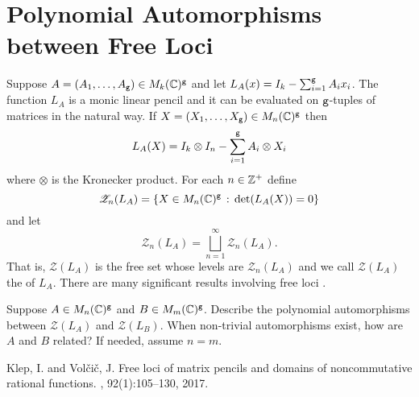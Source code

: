 \section{Polynomial Automorphisms between Free Loci}

Suppose $A = (A_1,\dots, A_{\texttt{g}})\in M_k(\mathbb{C})^{\texttt{g}}$ and let $L_A(x) = I_k - \sum_{i=1}^{\texttt{g}} A_ix_i$.
The function $L_A$ is a monic linear pencil and it can be evaluated on ${\texttt{g}}$-tuples of matrices in the natural way.
If $X = (X_1,\dots, X_{\texttt{g}})\in M_n(\mathbb{C})^{\texttt{g}}$ then
\[
	L_A(X) = I_k\otimes I_n - \sum_{i=1}^{\texttt{g}} A_i\otimes X_i
\]
where $\otimes$ is the Kronecker product. For each $n\in \mathbb{Z}^+$ define
\[
	\mathscr{Z}_n(L_A) = {\left\{X\in M_n(\mathbb{C})^{\texttt{g}} \, : \, \det(L_A(X)) = 0\right\}}
\]
and let
\[
	\mathscr{Z}_n(L_A) = \bigsqcup_{n=1}^\infty \mathscr{Z}_n(L_A).
\]
That is, $\mathscr{Z}(L_A)$ is the free set whose levels are $\mathscr{Z}_n(L_A)$ and we call $\mathscr{Z}(L_A)$ the  of $L_A$.
There are many significant results involving free loci \cite{KlVol17}.

\begin{problem}
	Suppose $A\in M_n(\mathbb{C})^{\texttt{g}}$ and $B\in M_m(\mathbb{C})^{\texttt{g}}$. Describe the polynomial automorphisms between $\mathscr{Z}(L_A)$ and 
	$\mathscr{Z}(L_B)$. When non-trivial automorphisms exist, how are $A$ and $B$ related? If needed, assume $n=m$.
\end{problem}




\begin{thebibliography}{1}

Klep, I. and Vol{\v c}i{\v c}, J.
\newblock Free loci of matrix pencils and domains of noncommutative rational functions.
, 92(1):105--130, 2017.



\end{thebibliography}